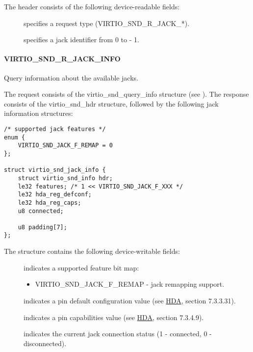 The header consists of the following device-readable fields:

\begin{description}
\item[] specifies a request type (VIRTIO_SND_R_JACK_*).
\item[] specifies a jack identifier from 0 to  - 1.
\end{description}

\paragraph{VIRTIO_SND_R_JACK_INFO}

Query information about the available jacks.

The request consists of the virtio_snd_query_info structure
(see ).
The response consists of the virtio_snd_hdr structure, followed by the following
jack information structures:

\begin{lstlisting}
/* supported jack features */
enum {
    VIRTIO_SND_JACK_F_REMAP = 0
};

struct virtio_snd_jack_info {
    struct virtio_snd_info hdr;
    le32 features; /* 1 << VIRTIO_SND_JACK_F_XXX */
    le32 hda_reg_defconf;
    le32 hda_reg_caps;
    u8 connected;

    u8 padding[7];
};
\end{lstlisting}

The structure contains the following device-writable fields:

\begin{description}
\item[] indicates a supported feature bit map:
\begin{itemize}
\item VIRTIO_SND_JACK_F_REMAP - jack remapping support.
\end{itemize}
\item[] indicates a pin default configuration value
(see \hyperref[intro:HDA]{HDA}, section 7.3.3.31).
\item[] indicates a pin capabilities value
(see \hyperref[intro:HDA]{HDA}, section 7.3.4.9).
\item[] indicates the current jack connection status
(1 - connected, 0 - disconnected).
\end{description}

